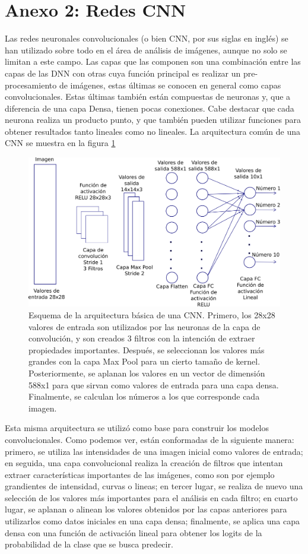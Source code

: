 \documentclass[11pt]{article}
\begin{document}
\section*{Anexo 2: Redes CNN}
Las redes neuronales convolucionales (o bien CNN, por sus siglas en inglés) se han utilizado sobre todo en el área de análisis de imágenes, aunque no solo se limitan a este campo. Las capas que las componen son una combinación entre las capas de las DNN con otras cuya función principal es realizar un pre-procesamiento de imágenes, estas últimas se conocen en general como capas convolucionales. Estas últimas también están compuestas de neuronas y, que a diferencia de una capa Densa, tienen pocas conexiones. Cabe destacar que cada neurona realiza un producto punto, y que también pueden utilizar funciones para obtener resultados tanto lineales como no lineales. La arquitectura común de una CNN se muestra en la figura \ref{fig:ES-CN}
\begin{figure}[H]
\begin{center}
    \includegraphics[scale=0.7]{ArquitecturaINK2.png}
\end{center}
    \caption{Esquema de la arquitectura básica de una CNN. Primero, los 28x28 valores de entrada son utilizados por las neuronas de la capa de convolución, y son creados 3 filtros con la intención de extraer propiedades importantes. Después, se seleccionan los valores más grandes con la capa Max Pool para un cierto tamaño de kernel. Posteriormente, se aplanan los valores en un vector de dimensión 588x1 para que sirvan como valores de entrada para una capa densa. Finalmente, se calculan los números a los que corresponde cada imagen.}
    \label{fig:ES-CN}
\end{figure}
Esta misma arquitectura se utilizó como base para construir los modelos convolucionales. Como podemos ver, están conformadas de la siguiente manera: primero, se utiliza las intensidades de una imagen inicial como valores de entrada; en seguida, una capa convolucional realiza la creación de filtros que intentan extraer características importantes de las imágenes, como son por ejemplo grandientes de intensidad, curvas o lineas; en tercer lugar, se realiza de nuevo una selección de los valores más importantes para el análisis en cada filtro; en cuarto lugar, se aplanan o alinean los valores obtenidos por las capas anteriores para utilizarlos como datos iniciales en una capa densa; finalmente, se aplica una capa densa con una función de activación lineal para obtener los logits de la probabilidad de la clase que se busca predecir.
\end{document}
